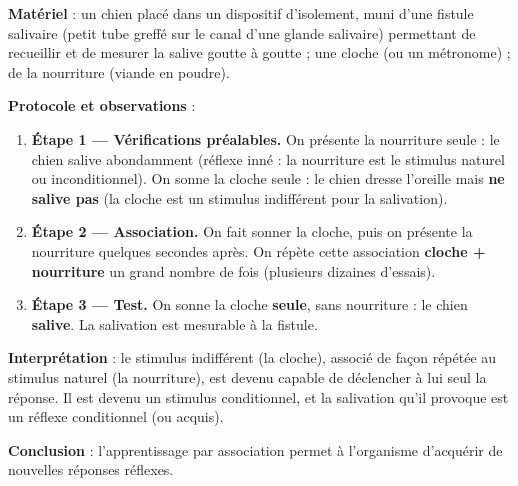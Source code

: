 \documentclass[11pt]{article}
\newcommand{\cle}[1]{{\popxbold\color{popdark}#1}}
\begin{document}
\begin{experience}
\textbf{Matériel} : un chien placé dans un dispositif d'isolement, muni d'une fistule salivaire (petit tube greffé sur le canal d'une glande salivaire) permettant de recueillir et de mesurer la salive goutte à goutte ; une cloche (ou un métronome) ; de la nourriture (viande en poudre).\par
\textbf{Protocole et observations} :
\begin{enumerate}
\item \textbf{Étape 1 — Vérifications préalables.} On présente la nourriture seule : le chien salive abondamment (réflexe inné : la nourriture est le \cle{stimulus naturel} ou inconditionnel). On sonne la cloche seule : le chien dresse l'oreille mais \textbf{ne salive pas} (la cloche est un \cle{stimulus indifférent} pour la salivation).
\item \textbf{Étape 2 — Association.} On fait sonner la cloche, puis on présente la nourriture quelques secondes après. On répète cette association \textbf{cloche + nourriture} un grand nombre de fois (plusieurs dizaines d'essais).
\item \textbf{Étape 3 — Test.} On sonne la cloche \textbf{seule}, sans nourriture : le chien \textbf{salive}. La salivation est mesurable à la fistule.
\end{enumerate}
\textbf{Interprétation} : le stimulus indifférent (la cloche), associé de façon répétée au stimulus naturel (la nourriture), est devenu capable de déclencher à lui seul la réponse. Il est devenu un \cle{stimulus conditionnel}, et la salivation qu'il provoque est un \cle{réflexe conditionnel} (ou acquis).\par
\textbf{Conclusion} : l'apprentissage par association permet à l'organisme d'acquérir de nouvelles réponses réflexes.
\end{experience}
\end{document}
